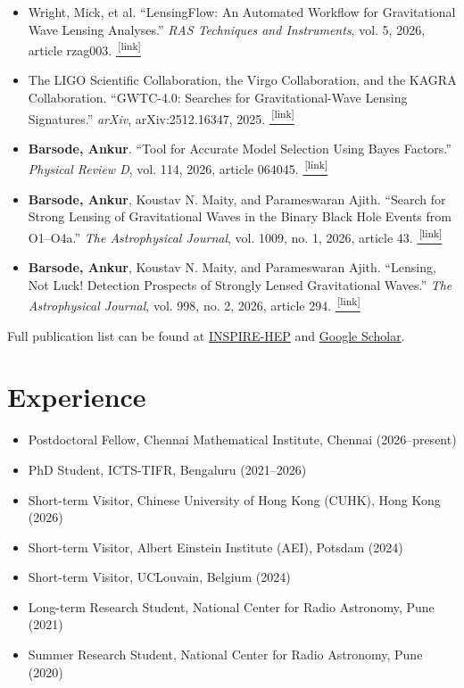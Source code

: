 \documentclass[a4paper,11pt]{article}
\newcommand{\publication}[2]{\item[--] #1\href{#2}{\,\textsuperscript{[link]}}}
\newcommand{\myname}{\textbf{Barsode, Ankur}}
\begin{document}
\begin{itemize}[nosep,after=\strut,leftmargin=1em,itemsep=3pt]
\publication{Wright, Mick, et al. ``LensingFlow: An Automated Workflow for Gravitational Wave Lensing Analyses.'' \textit{RAS Techniques and Instruments}, vol. 5, 2026, article rzag003. }{https://doi.org/10.1093/rasti/rzag003}
\publication{The LIGO Scientific Collaboration, the Virgo Collaboration, and the KAGRA Collaboration. ``GWTC-4.0: Searches for Gravitational-Wave Lensing Signatures.'' \textit{arXiv}, arXiv:2512.16347, 2025. }{https://arxiv.org/abs/2512.16347}
\else
\publication{\myname. ``Tool for Accurate Model Selection Using Bayes Factors.'' \textit{Physical Review D}, vol. 114, 2026, article 064045. }{https://doi.org/10.1103/wv11-h53b}
\publication{\myname, Koustav N. Maity, and Parameswaran Ajith. ``Search for Strong Lensing of Gravitational Waves in the Binary Black Hole Events from O1--O4a.'' \textit{The Astrophysical Journal}, vol. 1009, no. 1, 2026, article 43. }{https://doi.org/10.3847/1538-4357/ae9d69}
\publication{\myname, Koustav N. Maity, and Parameswaran Ajith. ``Lensing, Not Luck! Detection Prospects of Strongly Lensed Gravitational Waves.'' \textit{The Astrophysical Journal}, vol. 998, no. 2, 2026, article 294. }{https://doi.org/10.3847/1538-4357/ae38c1}
\fi
\end{itemize}

Full publication list can be found at \href{https://inspirehep.net/authors/3081663}{INSPIRE-HEP} and \href{https://scholar.google.com/citations?user=HiMMiqgAAAAJ\&hl=en}{Google Scholar}.

\section{Experience}
\begin{itemize}[nosep,after=\strut,leftmargin=1em,itemsep=3pt]
\item[--] Postdoctoral Fellow, Chennai Mathematical Institute, Chennai (2026--present)
\item[--] PhD Student, ICTS-TIFR, Bengaluru (2021--2026)
\item[--] Short-term Visitor, Chinese University of Hong Kong (CUHK), Hong Kong (2026)
\item[--] Short-term Visitor, Albert Einstein Institute (AEI), Potsdam (2024)
\item[--] Short-term Visitor, UCLouvain, Belgium (2024)
\item[--] Long-term Research Student, National Center for Radio Astronomy, Pune (2021)
\item[--] Summer Research Student, National Center for Radio Astronomy, Pune (2020)
\end{itemize}
\end{document}

